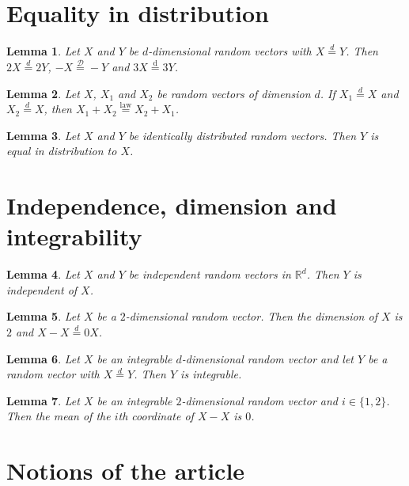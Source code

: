 \documentclass{article}
\newtheorem{lemma}{Lemma}
\begin{document}
\section{Equality in distribution}

\begin{lemma}\label{scaling}
Let $X$ and $Y$ be $d$-dimensional random vectors with $X\stackrel{d}{=}Y$. Then $2X\stackrel{d}{=}2Y$, $-X\overset{\mathcal{D}}{=}-Y$ and $3X\stackrel{\mathrm d}=3Y$.
\end{lemma}

\begin{lemma}\label{copies}
Let $X$, $X_1$ and $X_2$ be random vectors of dimension $d$. If $X_1\stackrel{d}{=}X$ and $X_2\stackrel{d}{=}X$, then $X_1+X_2\stackrel{\text{law}}{=}X_2+X_1$.
\end{lemma}

\begin{lemma}\label{words}
Let $X$ and $Y$ be identically distributed random vectors. Then $Y$ is equal in distribution to $X$.
\end{lemma}

\section{Independence, dimension and integrability}

\begin{lemma}\label{independent}
Let $X$ and $Y$ be independent random vectors in $\mathbb{R}^d$. Then $Y$ is independent of $X$.
\end{lemma}

\begin{lemma}\label{dimension}
Let $X$ be a $2$-dimensional random vector. Then the dimension of $X$ is $2$ and $X-X\stackrel{d}{=}0X$.
\end{lemma}

\begin{lemma}\label{integrable}
Let $X$ be an integrable $d$-dimensional random vector and let $Y$ be a random vector with $X\stackrel{d}{=}Y$. Then $Y$ is integrable.
\end{lemma}

\begin{lemma}\label{means}
Let $X$ be an integrable $2$-dimensional random vector and $i\in\{1,2\}$. Then the mean of the $i$th coordinate of $X-X$ is $0$.
\end{lemma}

\section{Notions of the article}
\end{document}
